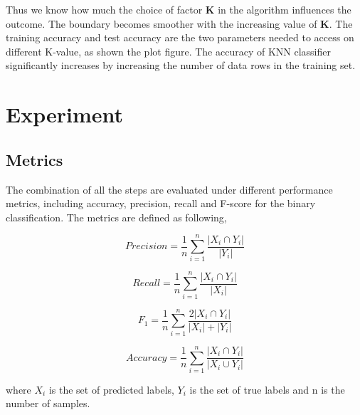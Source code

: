 \documentclass[conference]{IEEEtran}
\begin{document}
Thus we know how much the choice of factor \textbf{K} in the algorithm influences the outcome. The boundary becomes smoother with the increasing value of \textbf{K}. The training accuracy and test accuracy are the two parameters needed to access on different K-value, as shown the plot figure. The accuracy of KNN classifier significantly increases by increasing the number of data rows in the training set.



\section{Experiment}

\subsection{Metrics}
\label{sec:metrics}
The combination of all the steps are evaluated under different performance metrics, including accuracy, precision, recall and F-score for the binary classification. The metrics are defined as following,

\begin{equation}
Precision = \frac{1}{n}\sum\limits_{i=1}^{n} \frac{|X_i \cap Y_i|}{|Y_i|}
\end{equation}

\begin{equation}
Recall = \frac{1}{n}\sum\limits_{i=1}^{n} \frac{|X_i \cap Y_i|}{|X_i|}
\end{equation}

\begin{equation}
F_1 = \frac{1}{n}\sum\limits_{i=1}^{n} \frac{2|X_i \cap Y_i|}{|X_i| + |Y_i|}
\end{equation}

\begin{equation}
Accuracy = \frac{1}{n}\sum\limits_{i=1}^{n} \frac{|X_i \cap Y_i|}{|X_i \cup Y_i|}
\end{equation}

where $X_i$ is the set of predicted labels, $Y_i$ is the set of true labels and n is the number of samples.
\end{document}
